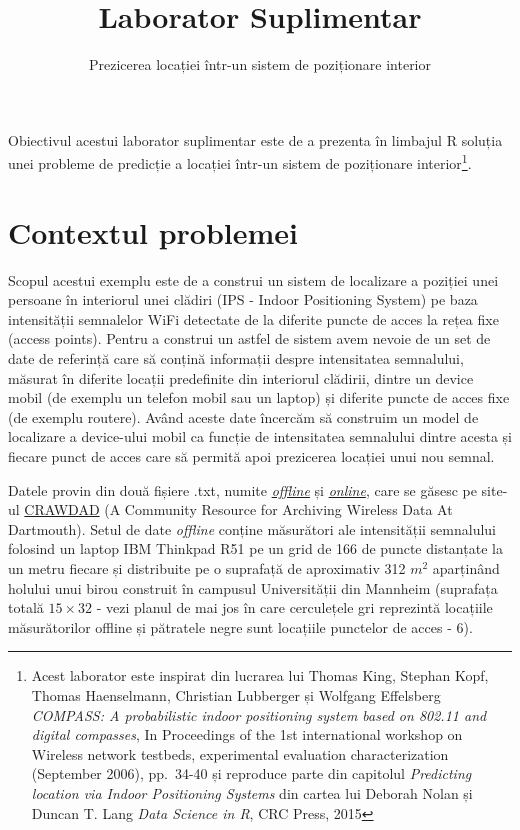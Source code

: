 \documentclass[]{article}
\title{Laborator Suplimentar}
\subtitle{Prezicerea locației într-un sistem de poziționare interior}
\author{}
\date{}
\let\rmarkdownfootnote\footnote%
\def\footnote{\protect\rmarkdownfootnote}
\begin{document}
\maketitle

\thispagestyle{fancy}

Obiectivul acestui laborator suplimentar este de a prezenta în limbajul
R soluția unei probleme de predicție a locației într-un sistem de
poziționare interior\footnote{Acest laborator este inspirat din lucrarea
  lui Thomas King, Stephan Kopf, Thomas Haenselmann, Christian Lubberger
  și Wolfgang Effelsberg \emph{COMPASS: A probabilistic indoor
  positioning system based on 802.11 and digital compasses}, In
  Proceedings of the 1st international workshop on Wireless network
  testbeds, experimental evaluation characterization (September 2006),
  pp.~34-40 și reproduce parte din capitolul \emph{Predicting location
  via Indoor Positioning Systems} din cartea lui Deborah Nolan și Duncan
  T. Lang \emph{Data Science in R}, CRC Press, 2015}.

\section{Contextul problemei}\label{contextul-problemei}

Scopul acestui exemplu este de a construi un sistem de localizare a
poziției unei persoane în interiorul unei clădiri (IPS - Indoor
Positioning System) pe baza intensității semnalelor WiFi detectate de la
diferite puncte de acces la rețea fixe (access points). Pentru a
construi un astfel de sistem avem nevoie de un set de date de referință
care să conțină informații despre intensitatea semnalului, măsurat în
diferite locații predefinite din interiorul clădirii, dintre un device
mobil (de exemplu un telefon mobil sau un laptop) și diferite puncte de
acces fixe (de exemplu routere). Având aceste date încercăm să construim
un model de localizare a device-ului mobil ca funcție de intensitatea
semnalului dintre acesta și fiecare punct de acces care să permită apoi
prezicerea locației unui nou semnal.

Datele provin din două fișiere .txt, numite
\href{lab_IPS_data/offline.final.trace.txt}{\emph{offline}} și
\href{lab_IPS_data/online.final.trace.txt}{\emph{online}}, care se
găsesc pe site-ul
\href{https://crawdad.org/mannheim/compass/20080411/}{CRAWDAD} (A
Community Resource for Archiving Wireless Data At Dartmouth). Setul de
date \emph{offline} conține măsurători ale intensității semnalului
folosind un laptop IBM Thinkpad R51 pe un grid de 166 de puncte
distanțate la un metru fiecare și distribuite pe o suprafață de
aproximativ 312 \(m^2\) aparținând holului unui birou construit în
campusul Universității din Mannheim (suprafața totală \(15\times 32\) -
vezi planul de mai jos în care cerculețele gri reprezintă locațiile
măsurătorilor offline și pătratele negre sunt locațiile punctelor de
acces - 6).
\end{document}
